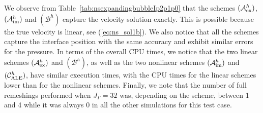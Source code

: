 \documentclass[a4paper,12pt,onecolumn]{article}
\newcommand{\schemeAex}{{\mathcal{A}^h_{\rm ex}}}
\newcommand{\schemeAim}{{\mathcal{A}^h_{\rm im}}}
\newcommand{\schemeB}{{\mathcal{B}^h}}
\newcommand{\schemeALE}{{\mathcal{C}^h_{\rm ALE}}}
\begin{document}
We observe from Table~\ref{tab:nsexpandingbubbleIp2p1p0}
that the schemes $(\schemeAex)$, $(\schemeAim)$ and $(\schemeB)$ capture the
velocity solution exactly. This is possible because the true velocity is linear,
see (\ref{eq:ns_sol1b}). We also notice that all the schemes capture the
interface position with the same accuracy and exhibit similar errors for the
pressure. In terms of the overall CPU times, we notice that the two linear
schemes $(\schemeAex)$ and $(\schemeB)$, as well as the two nonlinear schemes
$(\schemeAim)$ and $(\schemeALE)$, have similar execution times, with the CPU
times for the linear schemes lower than for the nonlinear schemes. Finally, we
note that the number of full remeshings performed when $J_\Gamma = 32$ was,
depending on the scheme, between 1 and 4  while it was always 0 in all the
other simulations for this test case.
\end{document}
